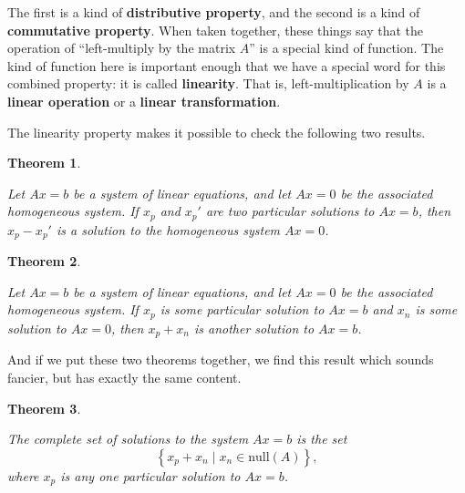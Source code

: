 \documentclass[10pt,]{book}
\newcommand{\terminology}[1]{\textbf{#1}}
\theoremstyle{plain}
\newtheorem{theorem}{Theorem}[chapter]
\theoremstyle{definition}
\numberwithin{equation}{section}
\begin{document}
      The first is a kind of \terminology{distributive property}, and the second
      is a kind of \terminology{commutative property}. When taken together, these
      things say that the operation of ``left-multiply by the matrix \(A\)''
      is a special kind of function. The kind of function here is important
      enough that we have a special word for this combined property: it is
      called \terminology{linearity}. That is, left-multiplication by \(A\) is a
      \terminology{linear operation} or a \terminology{linear transformation}.
\par

      The linearity property makes it possible to check the following two results.
\begin{theorem}\label{theorem-4}

        Let \(Ax=b\) be a system of linear equations, and let \(Ax=0\) be
        the associated homogeneous system. If \(x_p\) and \(x_p'\) are
        two particular solutions to \(Ax=b\), then \(x_p - x_p'\) is a
        solution to the homogeneous system \(Ax=0\).
      \end{theorem}
\begin{theorem}\label{theorem-5}

        Let \(Ax=b\) be a system of linear equations, and let \(Ax=0\)
        be the associated homogeneous system.
        If \(x_p\) is some particular solution to \(Ax=b\) and
        \(x_n\) is some solution to \(Ax=0\), then \(x_p + x_n\) is
        another solution to \(Ax=b\).
      \end{theorem}
\par

      And if we put these two theorems together, we find this result which
      sounds fancier, but has exactly the same content.
\begin{theorem}\label{theorem-6}

        The complete set of solutions to the system \(Ax=b\) is the set
        \[
          \left\{ x_p + x_n \mid x_n \in \mathrm{null}(A) \right\},
        \]
        where \(x_p\) is any one particular solution to \(Ax=b\).
      \end{theorem}
\par
\end{document}
